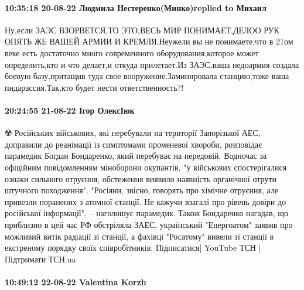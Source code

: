  
 
 
 
 

\paragraph{10:35:18 20-08-22 Людмила Нестеренко(Минко)replied to Михаил}

Ну,если ЗАЭС ВЗОРВЕТСЯ,ТО ЭТО,ВЕСЬ МИР ПОНИМАЕТ,ДЕЛОО РУК ОПЯТЬ ЖЕ ВАШЕЙ АРМИИ
И КРЕМЛЯ.Неужели вы не понимаете,что в 21ом веке есть достаточно много
современного оборудования,которое может определить,кто и что делает,и откуда
прилетает.Из ЗАЭС,ваша недоармия создала боевую базу,притащив туда свое
вооружение.Заминировала станцию,тоже ваша пидарассия.Так,кто будет нести
ответственность?!

\paragraph{20:24:55 21-08-22 Ігор ОлексІюк}

☢️ Російських військових, які перебували на території Запорізької АЕС, доправили до реанімації із симптомами променевої хвороби, розповідає парамедик Богдан Бондаренко, який перебуває на передовій. Водночас за офіційним повідомленням міноборони окупантів, "у військових спостерігалися ознаки сильного отруєння, обстеження виявило наявність органічної отрути штучного походження".
"Росіяни, звісно, говорять про хімічне отруєння, але привезли поранених з атомної станції. Не кажучи взагалі про рівень довіри до російської інформації", – наголошує парамедик. Також Бондаренко нагадав, що приблизно в цей час РФ обстріляла ЗАЕС, український "Енергоатом" заявив про можливий витік радіації зі станції, а фахівці "Росатому" вивели зі станції в екстреному порядку своїх співробітників.
Підписатися| YouTube ТСН | Підтримати ТСН.ua

\paragraph{10:49:12 22-08-22 Valentina Korzh}

